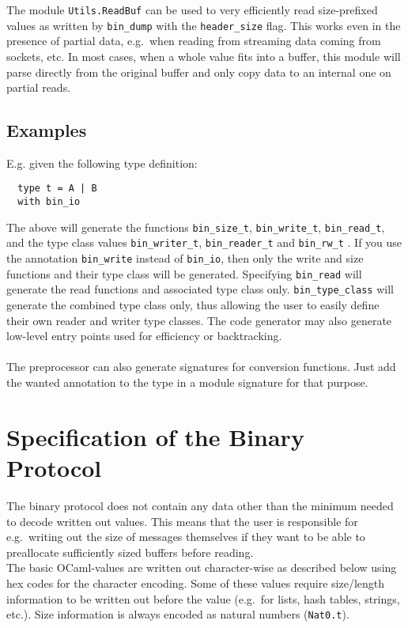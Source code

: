 \documentclass[12pt]{article}
\begin{document}
The module \verb=Utils.ReadBuf= can be used to very efficiently
read size-prefixed values as written by \verb=bin_dump= with the
\verb=header_size= flag.  This works even in the presence of partial
data, e.g.\ when reading from streaming data coming from sockets, etc.
In most cases, when a whole value fits into a buffer, this module will
parse directly from the original buffer and only copy data to an internal
one on partial reads.

\subsection{Examples}

E.g. given the following type definition:

\begin{verbatim}
  type t = A | B
  with bin_io
\end{verbatim}

The above will generate the functions \verb=bin_size_t=,
\verb=bin_write_t=, \verb=bin_read_t=, and the type class values
\verb=bin_writer_t=, \verb=bin_reader_t= and \verb=bin_rw_t= .  If you
use the annotation \verb=bin_write= instead of \verb=bin_io=, then only
the write and size functions and their type class will be generated.
Specifying \verb=bin_read= will generate the read functions and associated
type class only.  \verb=bin_type_class= will generate the combined type
class only, thus allowing the user to easily define their own reader
and writer type classes.  The code generator may also generate low-level
entry points used for efficiency or backtracking.\\
\\
The preprocessor can also generate signatures for conversion functions.
Just add the wanted annotation to the type in a module signature for
that purpose.

\section{Specification of the Binary Protocol}

The binary protocol does not contain any data other than the minimum
needed to decode written out values.  This means that the user is
responsible for e.g.\ writing out the size of messages themselves if
they want to be able to preallocate sufficiently sized buffers before
reading.\\

The basic OCaml-values are written out character-wise as described below
using hex codes for the character encoding.  Some of these values require
size/length information to be written out before the value (e.g.\ for
lists, hash tables, strings, etc.).  Size information is always encoded
as natural numbers (\verb=Nat0.t=).\\
\end{document}
